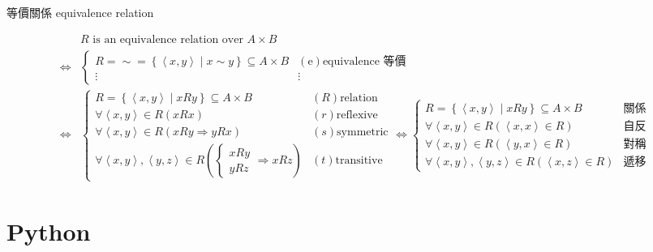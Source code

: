 \documentclass[
]{book}
\theoremstyle{definition}
\theoremstyle{definition}
\theoremstyle{definition}
\theoremstyle{definition}
\theoremstyle{remark}
\begin{document}
\begin{CJK}{UTF8}{bsmi}等價關係 equivalence relation \label{def:equivalence-relation}
\end{CJK}
\begin{CJK}{UTF8}{bsmi}
\begin{align*}
 & R\text{ is an equivalence relation over }A\times B\\
\Leftrightarrow & \begin{cases}
R=\sim=\left\{ \left\langle x,y\right\rangle \middle|x\sim y\right\} \subseteq A\times B & \left(\text{e}\right)\text{equivalence 等價}\\
\vdots & \vdots
\end{cases}\\
\Leftrightarrow & \begin{cases}
R=\left\{ \left\langle x,y\right\rangle \middle|xRy\right\} \subseteq A\times B & \left(R\right)\text{relation}\\
\forall\left\langle x,y\right\rangle \in R\left(xRx\right) & \left(r\right)\text{reflexive}\\
\forall\left\langle x,y\right\rangle \in R\left(xRy\Rightarrow yRx\right) & \left(s\right)\text{symmetric}\\
\forall\left\langle x,y\right\rangle ,\left\langle y,z\right\rangle \in R\left(\begin{cases}
xRy\\
yRz
\end{cases}\Rightarrow xRz\right) & \left(t\right)\text{transitive}
\end{cases}\Leftrightarrow\begin{cases}
R=\left\{ \left\langle x,y\right\rangle \middle|xRy\right\} \subseteq A\times B & \text{關係}\\
\forall\left\langle x,y\right\rangle \in R\left(\left\langle x,x\right\rangle \in R\right) & \text{自反}\\
\forall\left\langle x,y\right\rangle \in R\left(\left\langle y,x\right\rangle \in R\right) & \text{對稱}\\
\forall\left\langle x,y\right\rangle ,\left\langle y,z\right\rangle \in R\left(\left\langle x,z\right\rangle \in R\right) & \text{遞移}
\end{cases}
\end{align*}
\end{CJK}

\hypertarget{python}{%
\chapter{Python}\label{python}}
\end{document}
